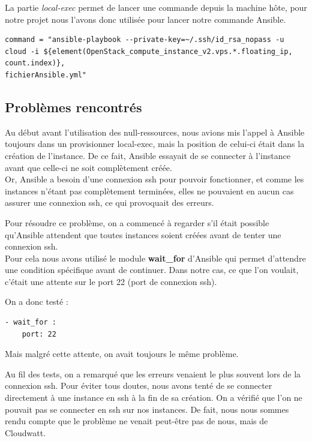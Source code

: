\documentclass[]{article}
\begin{document}
La partie \textit{local-exec} permet de lancer une commande depuis la machine hôte, pour notre projet nous l'avons donc utilisée pour lancer notre commande Ansible.
\begin{verbatim}
command = "ansible-playbook --private-key=~/.ssh/id_rsa_nopass -u 
cloud -i ${element(OpenStack_compute_instance_v2.vps.*.floating_ip, count.index)},
fichierAnsible.yml"
\end{verbatim}


\subsection{Problèmes rencontrés}\label{probluxe8me-que-lon-a-eu}

Au début avant l'utilisation des null-ressources, nous avions mis l'appel à Ansible toujours dans un provisionner local-exec, mais la position de celui-ci était dans la création de l'instance. De ce fait, Ansible essayait de se connecter à l'instance avant que celle-ci ne soit complètement créée. \\ Or, Ansible a besoin d'une connexion ssh pour pouvoir fonctionner, et comme les instances
n'étant pas complètement terminées, elles ne pouvaient en aucun cas
assurer une connexion ssh, ce qui provoquait des erreurs.

Pour résoudre ce problème, on a commencé à regarder s'il était possible
qu'Ansible attendent que toutes instances soient créées avant de tenter
une connexion ssh.\\
 Pour cela nous avons utilisé le module
\textbf{wait\_for} d'Ansible qui permet d'attendre une condition
spécifique avant de continuer. Dans notre cas, ce que l'on voulait,
c'était une attente sur le port 22 (port de connexion ssh).

On a donc testé :

\begin{verbatim}
- wait_for :
    port: 22
\end{verbatim}

Mais malgré cette attente, on avait toujours le même problème.

Au fil des tests, on a remarqué que les erreurs venaient le plus souvent
lors de la connexion ssh. Pour éviter tous doutes, nous avons tenté de se
connecter directement à une instance en ssh à  la fin de sa création.
On a vérifié que l'on ne pouvait pas se connecter en
ssh sur nos instances. De fait, nous nous sommes rendu compte que le problème ne
venait peut-être pas de nous, mais de Cloudwatt. 
\end{document}
